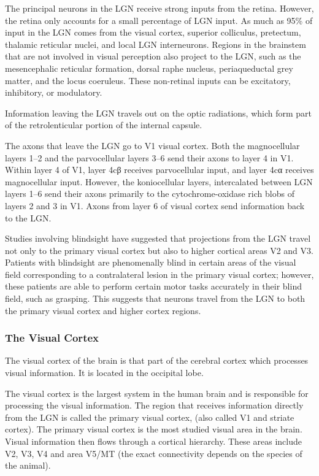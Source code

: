 The principal neurons in the LGN receive strong inputs from the retina.
However, the retina only accounts for a small percentage of LGN input.
As much as 95\% of input in the LGN comes from the visual cortex,
superior colliculus, pretectum, thalamic reticular nuclei, and local LGN
interneurons. Regions in the brainstem that are not involved in visual
perception also project to the LGN, such as the mesencephalic reticular
formation, dorsal raphe nucleus, periaqueductal grey matter, and the
locus coeruleus. These non-retinal inputs can be excitatory, inhibitory,
or modulatory.

Information leaving the LGN travels out on the optic radiations, which
form part of the retrolenticular portion of the internal capsule.

The axons that leave the LGN go to V1 visual cortex. Both the
magnocellular layers 1--2 and the parvocellular layers 3--6 send their
axons to layer 4 in V1. Within layer 4 of V1, layer 4cβ receives
parvocellular input, and layer 4cα receives magnocellular input.
However, the koniocellular layers, intercalated between LGN layers 1--6
send their axons primarily to the cytochrome-oxidase rich blobs of
layers 2 and 3 in V1. Axons from layer 6 of visual cortex send
information back to the LGN.

Studies involving blindsight have suggested that projections from the
LGN travel not only to the primary visual cortex but also to higher
cortical areas V2 and V3. Patients with blindsight are phenomenally
blind in certain areas of the visual field corresponding to a
contralateral lesion in the primary visual cortex; however, these
patients are able to perform certain motor tasks accurately in their
blind field, such as grasping. This suggests that neurons travel from
the LGN to both the primary visual cortex and higher cortex regions.

\hypertarget{the-visual-cortex}{%
\subsubsection{The Visual Cortex}\label{the-visual-cortex}}

The visual cortex of the brain is that part of the cerebral cortex which
processes visual information. It is located in the occipital lobe.

The visual cortex is the largest system in the human brain and is
responsible for processing the visual information. The region that
receives information directly from the LGN is called the primary visual
cortex, (also called V1 and striate cortex). The primary visual cortex
is the most studied visual area in the brain. Visual information then
flows through a cortical hierarchy. These areas include V2, V3, V4 and
area V5/MT (the exact connectivity depends on the species of the
animal).

